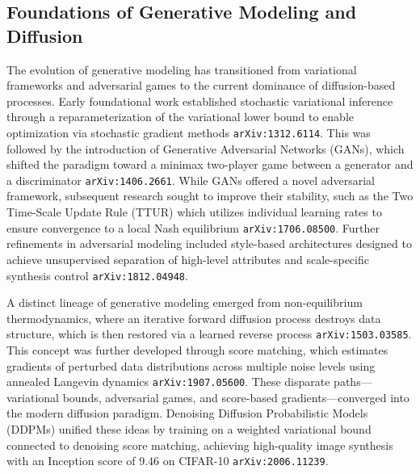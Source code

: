 \documentclass[11pt]{article}
\begin{document}
\subsection{Foundations of Generative Modeling and Diffusion}

The evolution of generative modeling has transitioned from variational frameworks and adversarial games to the current dominance of diffusion-based processes. Early foundational work established stochastic variational inference through a reparameterization of the variational lower bound to enable optimization via stochastic gradient methods \texttt{arXiv:1312.6114}. This was followed by the introduction of Generative Adversarial Networks (GANs), which shifted the paradigm toward a minimax two-player game between a generator and a discriminator \texttt{arXiv:1406.2661}. While GANs offered a novel adversarial framework, subsequent research sought to improve their stability, such as the Two Time-Scale Update Rule (TTUR) which utilizes individual learning rates to ensure convergence to a local Nash equilibrium \texttt{arXiv:1706.08500}. Further refinements in adversarial modeling included style-based architectures designed to achieve unsupervised separation of high-level attributes and scale-specific synthesis control \texttt{arXiv:1812.04948}.

A distinct lineage of generative modeling emerged from non-equilibrium thermodynamics, where an iterative forward diffusion process destroys data structure, which is then restored via a learned reverse process \texttt{arXiv:1503.03585}. This concept was further developed through score matching, which estimates gradients of perturbed data distributions across multiple noise levels using annealed Langevin dynamics \texttt{arXiv:1907.05600}. These disparate paths—variational bounds, adversarial games, and score-based gradients—converged into the modern diffusion paradigm. Denoising Diffusion Probabilistic Models (DDPMs) unified these ideas by training on a weighted variational bound connected to denoising score matching, achieving high-quality image synthesis with an Inception score of 9.46 on CIFAR-10 \texttt{arXiv:2006.11239}.
\end{document}
